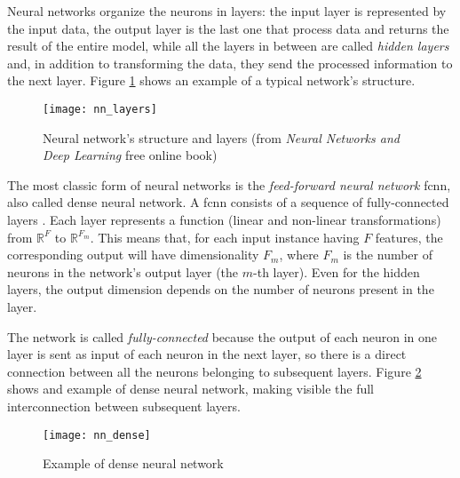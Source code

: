 Neural networks organize the neurons in layers: the input layer is represented by the input data, the output layer is the last one that process data and returns the result of the entire model, while all the layers in between are called \textit{hidden layers} and, in addition to transforming the data, they send the processed information to the next layer. Figure \ref{fig:nn_layers} shows an example of a typical network's structure.
\begin{figure}[htbp]
    \centering
    \texttt{[image: nn\_layers]}
    \caption{Neural network's structure and layers (from \textit{Neural Networks and Deep Learning} free online book)}
    \label{fig:nn_layers}
\end{figure}

The most classic form of neural networks is the \textit{feed-forward neural network} \acs{fcnn}, also called dense neural network. A \acs{fcnn} consists of a sequence of fully-connected layers \cite{OReilly:TFforDL}. Each layer represents a function (linear and non-linear transformations) from $\mathbb{R}^F$ to $\mathbb{R}^{F_m}$. This means that, for each input instance having $F$ features, the corresponding output will have dimensionality $F_m$, where $F_m$ is the number of neurons in the network's output layer (the $m$-th layer). Even for the hidden layers, the output dimension depends on the number of neurons present in the layer.

The network is called \textit{fully-connected} because the output of each neuron in one layer is sent as input of each neuron in the next layer, so there is a direct connection between all the neurons belonging to subsequent layers. Figure \ref{fig:nn_dense} shows and example of dense neural network, making visible the full interconnection between subsequent layers.
\begin{figure}[htbp]
    \centering
    \texttt{[image: nn\_dense]}
    \caption{Example of dense neural network}
    \label{fig:nn_dense}
\end{figure}

